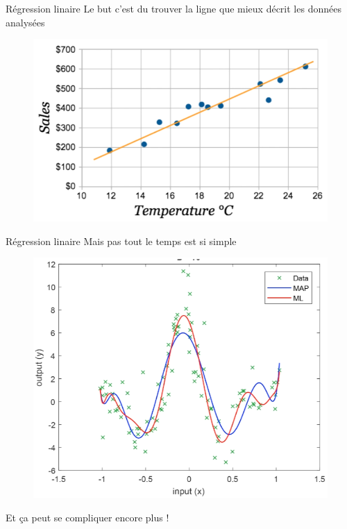 \documentclass[aspectratio=169,xcolor=dvipsnames, t]{beamer}
\begin{document}
\begin{frame}{Régression linaire}
	Le but c'est du trouver la ligne que mieux décrit les données analysées
	\begin{figure}
		\includegraphics[height=0.6\paperheight ]{figures/cm2_notMagic.png}
	\end{figure}
	
\end{frame}%
\begin{frame}{Régression linaire}
Mais pas tout le temps est si simple
\begin{figure}
	\includegraphics[height=0.6\paperheight ]{figures/cm2_notMagic2.png}
\end{figure}

Et ça peut se compliquer encore plus !
\end{frame}
\end{document}
